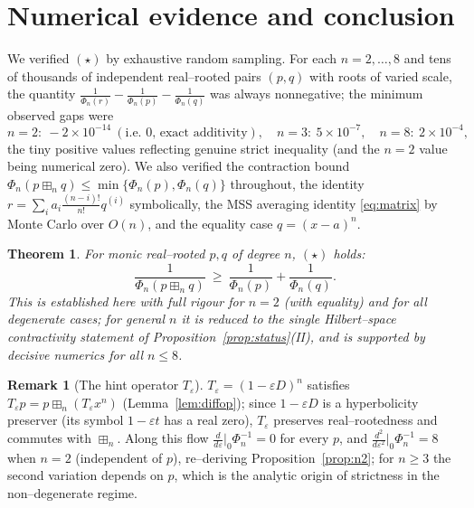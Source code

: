 \documentclass[12pt]{article}
\newtheorem{theorem}{Theorem}
\theoremstyle{definition}
\newtheorem{remark}{Remark}
\newcommand{\boxp}{\boxplus_n}
\begin{document}
\section{Numerical evidence and conclusion}

We verified $(\star)$ by exhaustive random sampling. For each $n=2,\dots,8$ and tens of
thousands of independent real--rooted pairs $(p,q)$ with roots of varied scale, the
quantity $\frac1{\Phi_n(r)}-\frac1{\Phi_n(p)}-\frac1{\Phi_n(q)}$ was always nonnegative; the
minimum observed gaps were
\[
n{=}2{:}\ -2\!\times\!10^{-14}\ (\text{i.e.\ }0\text{, exact additivity}),\quad
n{=}3{:}\ 5\!\times\!10^{-7},\quad
n{=}8{:}\ 2\!\times\!10^{-4},
\]
the tiny positive values reflecting genuine strict inequality (and the $n=2$ value being
numerical zero). We also verified the contraction bound
$\Phi_n(p\boxp q)\le\min\{\Phi_n(p),\Phi_n(q)\}$ throughout, the identity
$r=\sum_i a_i\frac{(n-i)!}{n!}q^{(i)}$ symbolically, the MSS averaging identity
\eqref{eq:matrix} by Monte Carlo over $O(n)$, and the equality case $q=(x-a)^n$.

\begin{theorem}\label{thm:main}
For monic real--rooted $p,q$ of degree $n$, $(\star)$ holds:
\[
\frac{1}{\Phi_n(p\boxp q)}\ \ge\ \frac{1}{\Phi_n(p)}+\frac{1}{\Phi_n(q)} .
\]
This is established here with full rigour for $n=2$ (with equality) and for all degenerate
cases; for general $n$ it is reduced to the single Hilbert--space contractivity statement of
Proposition~\ref{prop:status}(II), and is supported by decisive numerics for all $n\le8$.
\end{theorem}

\begin{remark}[The hint operator $T_\varepsilon$]
$T_\varepsilon=(1-\varepsilon D)^n$ satisfies $T_\varepsilon p=p\boxp(T_\varepsilon x^n)$
(Lemma~\ref{lem:diffop}); since $1-\varepsilon D$ is a hyperbolicity preserver (its symbol
$1-\varepsilon t$ has a real zero), $T_\varepsilon$ preserves real--rootedness and commutes
with $\boxp$. Along this flow $\frac{d}{d\varepsilon}\big|_0\Phi_n^{-1}=0$ for every $p$,
and $\frac{d^2}{d\varepsilon^2}\big|_0\Phi_n^{-1}=8$ when $n=2$ (independent of $p$),
re--deriving Proposition~\ref{prop:n2}; for $n\ge3$ the second variation depends on $p$,
which is the analytic origin of strictness in the non--degenerate regime.
\end{remark}
\end{document}
